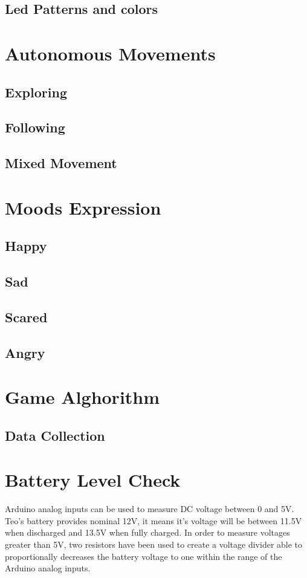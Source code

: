 \subsection{Led Patterns and colors}

\section{Autonomous Movements}
\subsection{Exploring}
\subsection{Following}
\subsection{Mixed Movement}
\section{Moods Expression}
\subsection{Happy}
\subsection{Sad}
\subsection{Scared}
\subsection{Angry}

\section{Game Alghorithm}
\subsection{Data Collection}
\section{Battery Level Check}
Arduino analog inputs can be used to measure DC voltage between 0 and 5V. Teo's battery provides nominal 12V, it means it's voltage will be between 11.5V when discharged and 13.5V when fully charged. In order to measure voltages greater than 5V, two resistors have been used to create a voltage divider able to proportionally decreases the battery voltage to one within the range of the Arduino analog inputs. 


